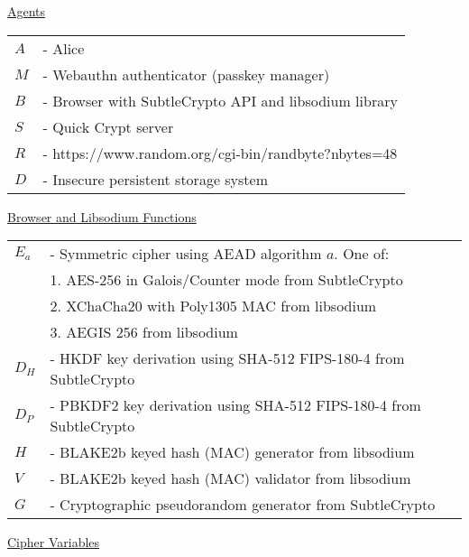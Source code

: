 \documentclass{article}
\begin{document}
\underline{Agents}\\

\begin{tabular}{@{}p{2mm} l}
$A$ & \textrm{ - Alice} \\
$M$ & \textrm{ - Webauthn authenticator (passkey manager)} \\
$B$ & \textrm{ - Browser with SubtleCrypto API and libsodium library} \\
$S$ & \textrm{ - Quick Crypt server} \\
$R$ & \textrm{ - https://www.random.org/cgi-bin/randbyte?nbytes=48} \\
$D$ & \textrm{ - Insecure persistent storage system} \\
\end{tabular}
      
\hfill \break


\underline{Browser and Libsodium Functions}\\

\begin{tabular}{@{}p{2mm} l}
$E_a$ & \textrm{ - Symmetric cipher using AEAD algorithm }$a$\textrm{. One of:}\\
& \hspace{23pt}\textrm{1. AES-256 in Galois/Counter mode from SubtleCrypto} \\
& \hspace{23pt}\textrm{2. XChaCha20 with Poly1305 MAC from libsodium} \\
& \hspace{23pt}\textrm{3. AEGIS 256 from libsodium} \\
$D_H$ & \textrm{ - HKDF key derivation using SHA-512 FIPS-180-4 from SubtleCrypto} \\
$D_P$ & \textrm{ - PBKDF2 key derivation using SHA-512 FIPS-180-4 from SubtleCrypto} \\
$H$ & \textrm{ - BLAKE2b keyed hash (MAC) generator from libsodium} \\
$V$ & \textrm{ - BLAKE2b keyed hash (MAC) validator from libsodium} \\
$G$ & \textrm{ - Cryptographic pseudorandom generator from SubtleCrypto} \\
\end{tabular}

\hfill \break

\underline{Cipher Variables}\\
\end{document}
